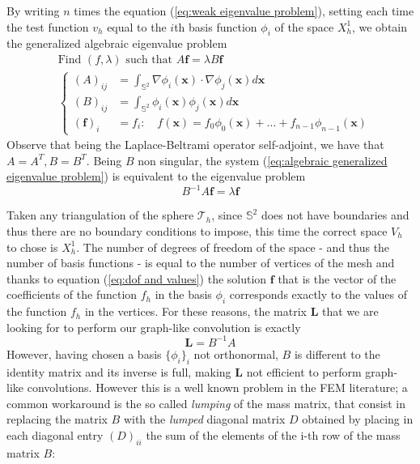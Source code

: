 By writing $n$ times the equation (\ref{eq:weak eigenvalue problem}), setting each time the test function $v_h$ equal to the $i$th basis function $\phi_i$ of the space $X_h^1$, we obtain the generalized algebraic eigenvalue problem
\begin{align}\label{eq:algebraic generalized eigenvalue problem}
	&\text{Find }(f,\lambda)\text{ such that }A\mathbf f = \lambda B \mathbf f\\
	&\begin{cases}
	(A)_{ij} &= \int_{\mathbb S^2}\nabla \phi_i(\mathbf{x})\cdot \nabla \phi_j(\mathbf{x})d\mathbf{x}\\
	(B)_{ij} &= \int_{\mathbb S^2} \phi_i(\mathbf{x}) \phi_j(\mathbf{x})d\mathbf{x}\\
	(\mathbf f)_i &= f_i:\quad f(\mathbf x) = f_0\phi_0(\mathbf x)+ ... + f_{n-1}\phi_{n-1}(\mathbf x) 
	\end{cases}
\end{align}
Observe that being the Laplace-Beltrami operator self-adjoint, we have that $A=A^T, B=B^T$. Being $B$ non singular, the system (\ref{eq:algebraic generalized eigenvalue problem}) is equivalent to the eigenvalue problem
\begin{equation}\label{eq:algebraic  eigenvalue problem}
B^{-1}A\mathbf f = \lambda \mathbf f
\end{equation}



Taken any triangulation of the sphere $\mathcal T_h$, since $\mathbb S^2$ does not have boundaries and thus there are no boundary conditions to impose, this time the correct space $V_h$ to chose is $X^1_h$. The number of degrees of freedom of the space - and thus the number of basis functions - is equal to the number of vertices of the mesh and thanks to equation (\ref{eq:dof and values}) the solution $\mathbf f$ that is the vector of the coefficients of the function $f_h$ in the basis $\phi_i$ corresponds exactly to the values of the function $f_h$ in the vertices. For these reasons, the matrix $\mathbf L$ that we are looking for to perform our graph-like convolution is exactly
$$
\mathbf L = B^{-1}A
$$
However, having chosen a basis $\{\phi_i\}_i$ not orthonormal, $B$ is different to the identity matrix and its inverse is full, making $\mathbf L$ not efficient to perform graph-like convolutions. However this is a well known problem in the FEM literature; a common workaround is the so called \textit{lumping} of the mass matrix, that consist in replacing the matrix $B$ with the \textit{lumped} diagonal matrix $D$ obtained by placing in each diagonal entry $(D)_{ii}$ the sum of the elements of the i-th row of the mass matrix $B$:

